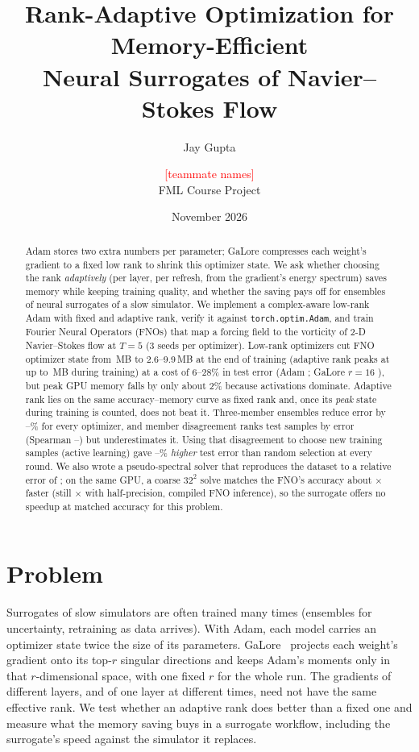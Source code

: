 \documentclass[11pt,a4paper]{article}
\title{Rank-Adaptive Optimization for Memory-Efficient\\Neural Surrogates of Navier--Stokes Flow}
\author{Jay Gupta \and \textcolor{red}{[teammate names]}\\[2pt] \small FML Course Project}
\date{November 2026}
\begin{document}
\maketitle

\begin{abstract}
Adam stores two extra numbers per parameter; GaLore compresses each weight's gradient to a fixed low rank to
shrink this optimizer state. We ask whether choosing the rank \emph{adaptively} (per layer, per refresh, from the
gradient's energy spectrum) saves memory while keeping training quality, and whether the saving pays off for
ensembles of neural surrogates of a slow simulator. We implement a complex-aware low-rank Adam with fixed and
adaptive rank, verify it against \texttt{torch.optim.Adam}, and train Fourier Neural Operators (FNOs) that map a
forcing field to the vorticity of 2-D Navier--Stokes flow at $T=5$ (3 seeds per optimizer).
Low-rank optimizers cut FNO optimizer state from \AdamState\,MB to 2.6--9.9\,MB at the end of training (adaptive rank peaks at up to \AdaHiPeak\,MB during training) at a cost of 6--28\% in test error
(Adam \FNOrel; GaLore $r{=}16$ \RsixteenRel), but peak GPU memory falls by only about 2\% because activations dominate.
Adaptive rank lies on the same accuracy--memory curve as fixed rank and, once its \emph{peak} state during training
is counted, does not beat it. Three-member ensembles reduce error by \EnsGainLo--\EnsGainHi\% for every optimizer,
and member disagreement ranks test samples by error (Spearman \SpearLo--\SpearHi) but underestimates it.
Using that disagreement to choose new training samples (active learning) gave \ALgapLo--\ALgapHi\% \emph{higher}
test error than random selection at every round.
We also wrote a pseudo-spectral solver that reproduces the dataset to a relative error of \SolverMean{}; on the same
GPU, a coarse $32^2$ solve matches the FNO's accuracy about \SolThirtyTwoSpeed$\times$ faster (still \FastGap$\times$ with
half-precision, compiled FNO inference), so the surrogate offers no speedup at matched accuracy for this problem.
\end{abstract}

\section{Problem}
Surrogates of slow simulators are often trained many times (ensembles for uncertainty, retraining as data
arrives). With Adam, each model carries an optimizer state twice the size of its parameters. GaLore~\cite{galore}
projects each weight's gradient onto its top-$r$ singular directions and keeps Adam's moments only in that
$r$-dimensional space, with one fixed $r$ for the whole run. The gradients of different layers, and of one layer at
different times, need not have the same effective rank. We test whether an adaptive rank does better than a fixed one
and measure what the memory saving buys in a surrogate workflow, including the surrogate's speed against the
simulator it replaces.
\end{document}
